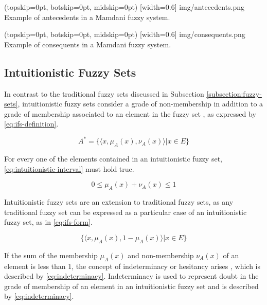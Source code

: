 ﻿\documentclass{ieeeaccess}
\begin{document}
\Figure[](topskip=0pt, botskip=0pt, midskip=0pt)
[width=0.6\linewidth]
{img/antecedents.png}
{Example of antecedents in a Mamdani fuzzy system.
  \label{figure:antecedents}}

\Figure[](topskip=0pt, botskip=0pt, midskip=0pt)
[width=0.6\linewidth]
{img/consequents.png}
{Example of consequents in a Mamdani fuzzy system.
  \label{figure:consequents}}

\subsection{Intuitionistic Fuzzy Sets}
\label{subsection:intuitionistic-fuzzy-sets}

In contrast to the traditional fuzzy sets discussed in Subsection
\ref{subsection:fuzzy-sets}, intuitionistic fuzzy sets consider a grade of
non-membership in addition to a grade of membership associated to an element in
the fuzzy set \cite{Atanassov1986}, as expressed by \ref{eq:ifs-definition}.

\begin{equation}
  \label{eq:ifs-definition}
  A^{*} = \{\langle x, \mu _{A} (x), \nu _{A} (x) \rangle | x \in E\}
\end{equation}

For every one of the elements contained in an intuitionistic fuzzy set, 
\ref{eq:intuitionistic-interval} must hold true.

\begin{equation}
  \label{eq:intuitionistic-interval}
  0 \leq \mu_{A}(x) + \nu_{A}(x) \leq 1
\end{equation}

Intuitionistic fuzzy sets are an extension to traditional fuzzy sets, as any
traditional fuzzy set can be expressed as a particular case of an intuitionistic
fuzzy set, as in \ref{eq:ifs-form}.

\begin{equation}
  \label{eq:ifs-form}
  \{ \langle x, \mu_{A}(x), 1 - \mu_{A}(x) \rangle | x \in E \}
\end{equation}

If the sum of the membership $\mu_{A}(x)$ and non-membership $\nu_{A}(x)$ of an
element is less than $1$, the concept of indeterminacy or hesitancy arises \cite{Atanassov1986},
which is described by \ref{eq:indeterminacy}. Indeterminacy is used to represent
doubt in the grade of membership of an element in an intuitionistic fuzzy set
and is described by \ref{eq:indeterminacy}.
\end{document}
